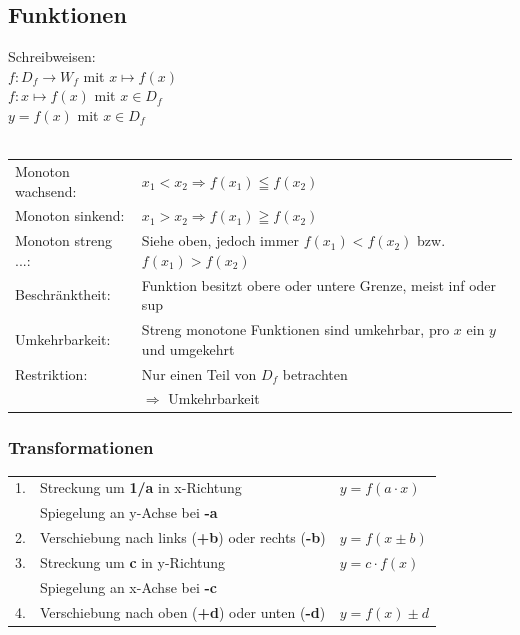	\subsection{Funktionen}

		Schreibweisen: \\
		$f:D_f \rightarrow W_f$ mit $x \mapsto f(x)$\\
		$f:x \mapsto f(x)$ mit $x \in D_f$\\
		$y=f(x)$ mit $x \in D_f$		 \\	
		\\
		\begin{tabular}{ll}
			Monoton wachsend:   & $x_1 < x_2 \Rightarrow f(x_1) \leqq f(x_2)$ \\
			Monoton sinkend:    & $x_1 > x_2 \Rightarrow f(x_1) \geqq f(x_2)$ \\
			Monoton streng ...: & Siehe oben, jedoch immer $f(x_1) < f(x_2)$ bzw. $f(x_1) > f(x_2)$ \\
			Beschränktheit:     & Funktion besitzt obere oder untere Grenze, meist inf oder sup \\
			Umkehrbarkeit:      & Streng monotone Funktionen sind umkehrbar, pro $x$ ein $y$ und umgekehrt \\
			Restriktion:        & Nur einen Teil von $D_f$ betrachten \\ 
				                & $\Rightarrow$ Umkehrbarkeit \\
		\end{tabular}
						
		\subsubsection{Transformationen}	
			\begin{tabular}{lll}
				1. & Streckung um \textbf{1/a} in x-Richtung & $y = f(a \cdot x)$ \\
				   & Spiegelung an y-Achse bei \textbf{-a} & \\
				2. & Verschiebung nach links (\textbf{+b}) oder rechts  (\textbf{-b}) & $y = f(x \pm b)$\\
				3. & Streckung um \textbf{c} in y-Richtung & $y = c \cdot f(x)$ \\
				   & Spiegelung an x-Achse bei \textbf{-c} & \\
				4. & Verschiebung nach oben (\textbf{+d}) oder unten (\textbf{-d}) & $y = f(x) \pm d $ \\
			\end{tabular}
			
